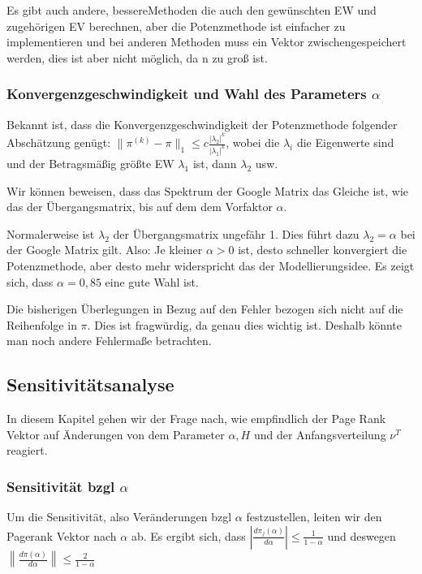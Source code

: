 \documentclass[]{article}
\begin{document}
Es gibt auch andere, \glqq bessere\grqq Methoden die auch den gewünschten EW und zugehörigen EV berechnen, aber die Potenzmethode ist einfacher zu implementieren und bei anderen Methoden muss ein Vektor zwischengespeichert werden, dies ist aber nicht möglich, da n zu groß ist. 

\subsubsection{Konvergenzgeschwindigkeit und Wahl des Parameters $\alpha$} 

Bekannt ist, dass die Konvergenzgeschwindigkeit der Potenzmethode folgender Abschätzung genügt: $\| \pi^{(k)} - \pi\|_1 \le c \frac{|\lambda_2|^k}{|\lambda_1|^k}$, wobei die $\lambda_i$ die Eigenwerte sind und der Betragsmäßig größte EW $\lambda_1$ ist, dann $\lambda_2$ usw.   

Wir können beweisen, dass das Spektrum der Google Matrix das Gleiche ist, wie das der Übergangsmatrix, bis auf dem dem Vorfaktor $\alpha $. 

Normalerweise ist $\lambda_2$ der Übergangsmatrix ungefähr 1. Dies führt dazu $\lambda_2 = \alpha$ bei der Google Matrix gilt. Also: Je kleiner $\alpha>0$ ist, desto schneller konvergiert die Potenzmethode, aber desto mehr widerspricht das der Modellierungsidee. Es zeigt sich, dass $\alpha = 0,85$ eine gute Wahl ist.     

Die bisherigen Überlegungen in Bezug auf den Fehler bezogen sich nicht auf die Reihenfolge in $\pi$. Dies ist fragwürdig, da genau dies wichtig ist. Deshalb könnte man noch andere Fehlermaße betrachten.

\subsection{Sensitivitätsanalyse}

In diesem Kapitel gehen wir der Frage nach, wie empfindlich der Page Rank Vektor auf Änderungen von dem Parameter $\alpha, H $ und der Anfangsverteilung $\nu^T$ reagiert. 

\subsubsection*{Sensitivität bzgl $\alpha$}
Um die Sensitivität, also Veränderungen bzgl $\alpha$ festzustellen, leiten wir den Pagerank Vektor nach $\alpha$ ab. Es ergibt sich, dass $\left| \frac{d \pi_j(\alpha)}{d \alpha}\right| \le \frac{1}{1 - \alpha} $ und deswegen $\left\| \frac{d \pi(\alpha)}{d \alpha} \right\| \le \frac{2}{1 - \alpha} $ \\
\end{document}
